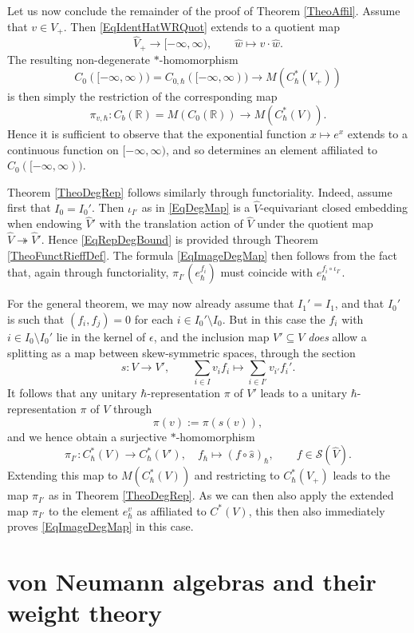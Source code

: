 \documentclass[11pt, reqno]{amsart}
\theoremstyle{definition}
\numberwithin{equation}{section}
\def\R{\mathbb R}
\begin{document}
Let us now conclude the remainder of the proof of Theorem \ref{TheoAffil}. Assume that $v\in V_+$. Then \eqref{EqIdentHatWRQuot} extends to a quotient map 
\[
\hat{V}_+ \rightarrow [-\infty,\infty),\qquad \hat{w}\mapsto v\cdot \hat{w}.
\]
The resulting non-degenerate $*$-homomorphism 
\[
C_0([-\infty,\infty)) = C_{0,\hbar}([-\infty,\infty)) \rightarrow M(C^*_{\hbar}(V_+))
\]
is then simply the restriction of the corresponding map 
\[
\pi_{v,\hbar}\colon  C_b(\R) = M(C_0(\R)) \rightarrow M(C^*_{\hbar}(V)). 
\]
Hence it is sufficient to observe that the exponential function $x \mapsto e^x$ extends to a continuous function on $[-\infty,\infty)$, and so determines an element affiliated to $C_0([-\infty,\infty))$.   

Theorem \ref{TheoDegRep} follows similarly through functoriality. Indeed, assume first that $I_0 = I_0'$. Then $\iota_{I'}$ as in \eqref{EqDegMap} is a $\hat{V}$-equivariant closed embedding when endowing $\hat{V}'$ with the translation action of $\hat{V}$ under the quotient map $\hat{V}\twoheadrightarrow \hat{V}'$. Hence \eqref{EqRepDegBound} is provided through Theorem \ref{TheoFunctRieffDef}. The formula \eqref{EqImageDegMap} then follows from the fact that, again through functoriality, $\pi_{I'}(e_{\hbar}^{f_i})$ must coincide with $e_{\hbar}^{f_i \circ \iota_{I'}}$. 

For the general theorem, we may now already assume that $I_1' = I_1$, and that $I_0'$ is such that $(f_i,f_j) =0$ for each $i \in I_0'\setminus I_0$. But in this case the $f_i$ with $i\in I_0\setminus I_0'$ lie in the kernel of $\epsilon$, and the inclusion map $V'\subseteq V$ \emph{does} allow a splitting as a map between skew-symmetric spaces, through the section
\[
s\colon  V \rightarrow V',\qquad \sum_{i\in I} v_i f_i \mapsto \sum_{i\in I'} v_{i'}f_i'. 
\]
It follows that any unitary $\hbar$-representation $\pi$ of $V'$ leads to a unitary $\hbar$-representation $\pi$ of $V$ through
\[
\pi(v) :=  \pi(s(v)),
\]
and we hence obtain a surjective $*$-homomorphism 
\[
\pi_{I'}\colon  C_{\hbar}^*(V) \rightarrow C_{\hbar}^*(V'), \quad f_{\hbar} \mapsto (f\circ \hat{s})_{\hbar},\qquad f \in \mathcal{S}(\hat{V}). 
\]
Extending this map to $M(C_{\hbar}^*(V))$ and restricting to $C_{\hbar}^*(V_+)$ leads to the map $\pi_{I'}$ as in Theorem \ref{TheoDegRep}. As we can then also apply the extended map $\pi_{I'}$ to the element $e_{\hbar}^v$ as affiliated to $C^*(V)$, this then also immediately proves \eqref{EqImageDegMap} in this case.

\section{von Neumann algebras and their weight theory}\label{AppWeights}
\end{document}
